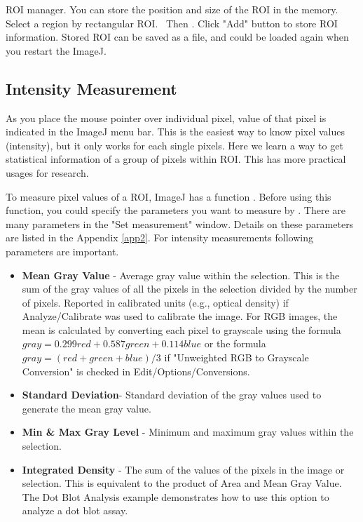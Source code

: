 \begin{indentexercise}{5}
ROI manager. You can store the position and
size of the ROI in the memory. Select a region by rectangular ROI.
\ Then . Click "Add" button to store
ROI information. Stored ROI can be saved as a file, and could be loaded
again when you restart the ImageJ.
\end{indentexercise}


\subsection{Intensity Measurement}

As you place the mouse pointer over individual pixel, value of that
pixel is indicated in the ImageJ menu bar. This is the easiest way to
know pixel values (intensity), but it only works for each single
pixels. Here we learn a way to get statistical information of a group
of pixels within ROI. This has more practical usages for research. 

To measure pixel values of a ROI, ImageJ has a function . Before using this function, you could specify the parameters 
you want to measure by . There are many parameters
in the "Set measurement" window. Details on these parameters are listed in the
Appendix \ref{app2}. For intensity measurements following parameters are
important.


\begin{itemize}
\item \textbf{Mean Gray Value} - Average gray value within the selection. This
is the sum of the gray values of all the pixels in the selection
divided by the number of pixels. Reported in calibrated units (e.g.,
optical density) if Analyze/Calibrate was used to calibrate the image.
For RGB images, the mean is calculated by converting each pixel to
grayscale using the formula $gray=0.299red+0.587green+0.114blue$ or the
formula $gray=(red+green+blue)/3$ if "Unweighted RGB to
Grayscale Conversion" is checked in Edit/Options/Conversions.

\item\textbf{Standard Deviation}{}- Standard deviation of the gray values
used to generate the mean gray value.

\item\textbf{Min \& Max Gray Level} - Minimum and maximum gray values within
the selection.

\item\textbf{Integrated Density} - The sum of the values of the pixels in the
image or selection. This is equivalent to the product of Area and Mean
Gray Value. The Dot Blot Analysis example demonstrates how to use this
option to analyze a dot blot assay.
\end{itemize}

